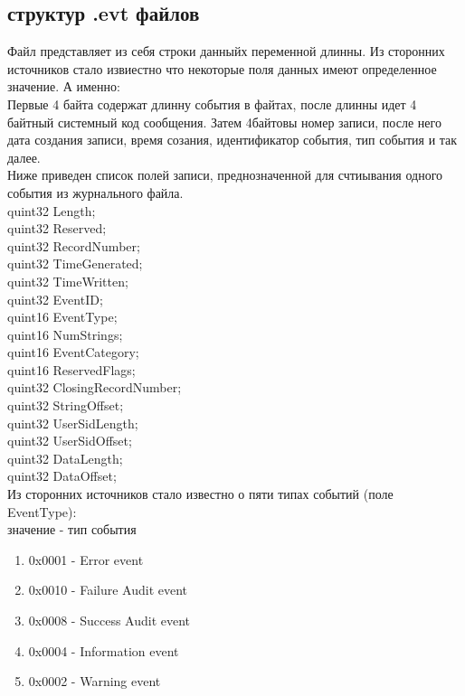 \subsection{структур .evt файлов}

Файл представляет из себя строки данныйх переменной длинны. Из сторонних источников стало извиестно что некоторые поля данных имеют определенное значение. А именно: \\
Первые 4 байта содержат длинну события в файтах, после длинны идет 4 байтный системный код сообщения. Затем 4байтовы номер записи, после него дата создания записи, время созания, идентификатор события, тип события и так далее. \\

Ниже приведен список полей записи, преднозначенной для счтиывания одного события из журнального файла. \\

	quint32 Length; \\
	quint32 Reserved; \\
	quint32 RecordNumber; \\
	quint32 TimeGenerated; \\
	quint32 TimeWritten; \\
	quint32 EventID; \\
	quint16 EventType; \\
	quint16 NumStrings; \\
	quint16 EventCategory; \\
	quint16 ReservedFlags; \\
	quint32 ClosingRecordNumber; \\
	quint32 StringOffset; \\
	quint32 UserSidLength; \\
	quint32 UserSidOffset; \\
	quint32 DataLength; \\
	quint32 DataOffset; \\

Из сторонних источников стало известно о пяти типах событий (поле EventType): \\

значение - тип события \\

\begin{enumerate}
\item 0x0001 - Error event
\item 0x0010 - Failure Audit event
\item 0x0008 - Success Audit event
\item 0x0004 - Information event
\item 0x0002 - Warning event
\end{enumerate}

